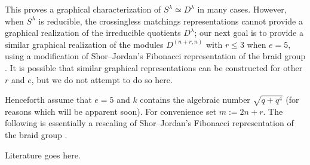 \documentclass{amsart}
\begin{document}
  This proves a graphical characterization of $S^\lambda \simeq D^\lambda$ in many cases.
  However, when $S^\lambda$ is reducible, the crossingless matchings representations cannot provide a graphical realization of the irreducible quotients $D^\lambda$;
  our next goal is to provide a similar graphical realization of the modules $D^{(n+r,n)}$ with $r \leq 3$ when $e=5$, using a modification of Shor--Jordan's Fibonacci representation of the braid group \cite{Shor}.
  It is possible that similar graphical representations can be constructed for other $r$ and $e$, but we do not attempt to do so here.
  
  \def\vara{\alpha_1}
  \def\varb{\alpha_2}
  \def\varc{\varepsilon_1}
  \def\vard{\delta}
  \def\vare{\varepsilon_2}
  \def\vs{\texttt{*}}
  \def\vp{\texttt{0}}
  Henceforth assume that $e = 5$ and $k$ contains the algebraic number $\sqrt{q + q^4}$ (for reasons which will be apparent soon).
  For convenience set $m := 2n + r$.
  The following is essentially a rescaling of Shor--Jordan's Fibonacci representation of the braid group \cite{Shor}.
 
  {\color{orange} Literature goes here.}
\end{document}
